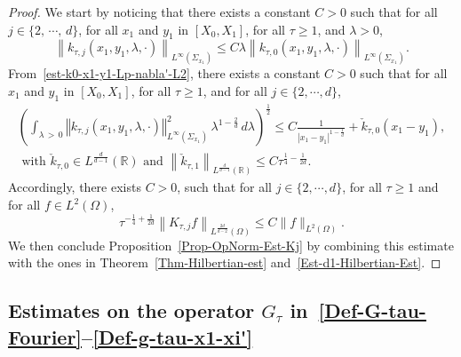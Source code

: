 \documentclass[10pt]{amsart}
\theoremstyle{definition}\newtheorem{defi}[theo]{Definition}\newtheorem{rema}[theo]{Remark}\newtheorem{exam}[theo]{Example}\newtheorem{exem}[theo]{Example}\newtheorem{nota}[theo]{Notation}
\newcommand*\R{\mathbb{R}}
\newcommand{\norm}[1]{\left\Vert#1\right\Vert}
\renewcommand{\leq}{\leqslant}
\renewcommand{\geq}{\geqslant}
\begin{document}
\begin{proof}
We start by noticing that there exists a constant $C >0$ such that for all $j \in \{2, \,\cdots,\,d\}$, for all $x_1$ and $y_1$ in $[X_0, X_1]$, for all $\tau \geq 1$, and $\lambda >0$,
\begin{equation*}\label{Est-k-tau-j-x1-y1}
\left\| k_{\tau, j}(x_1,y_1,\lambda, \cdot) \right\|_{L^\infty\left(\Sigma_{x_1}\right)}
\leq C \lambda \left\| k_{\tau, 0}(x_1,y_1,\lambda, \cdot) \right\|_{L^\infty\left(\Sigma_{x_1}\right)}.
\end{equation*}
From~\eqref{est-k0-x1-y1-Lp-nabla'-L2}, there exists a constant $C >0$ such that for all $x_1$ and $y_1$ in $[X_0, X_1]$, for all $\tau \geq 1$, and for all $j \in \{2, \cdots, d\}$,
\begin{multline}\label{est-kj-x1-y1-Lp-L2}
\left(\int_{\lambda\,>\,0} \norm{k_{\tau,j}(x_1, y_1,\lambda, \cdot) }^2_{L^\infty(\Sigma_{x_1})} \, \lambda^{1 -\frac{2}{d}}\, d\lambda\right)^{\frac{1}{2}}
\leq C\frac{1}{|x_1-y_1|^{1-\frac{1}{d}}} + \check k_{\tau,0}(x_1-y_1),
\\
\text{ with }\check k_{\tau,0} \in L^{\frac{d}{d-1}} (\R)\text{ and }
\left\|\check k_{\tau,1}\right\|_{L^{\frac{d}{d-1}} (\R)} \leq C \tau^{\frac{1}{4}-\frac{1}{2d}}.
\end{multline}
Accordingly, there exists $C>0$, such that for all $j \in \{2, \cdots, d\}$, for all $\tau \geq 1$ and for all $f \in L^2(\Omega)$,
\begin{equation*}
\tau^{-\frac{1}{4}+\frac{1}{2d}} \left\| K_{\tau,j} f\right\|_{L^{\frac{2d}{d-2}}(\Omega)}
\leq C \| f \|_{L^2(\Omega)}.
\end{equation*}
We then conclude Proposition~\ref{Prop-OpNorm-Est-Kj} by combining this estimate with the ones in Theorem~\ref{Thm-Hilbertian-est} and~\eqref{Est-d1-Hilbertian-Est}.
\end{proof}


\subsection{Estimates on the operator \texorpdfstring{$G_\tau$}{G tau} in~\eqref{Def-G-tau-Fourier}--\eqref{Def-g-tau-x1-xi'}}
\end{document}
